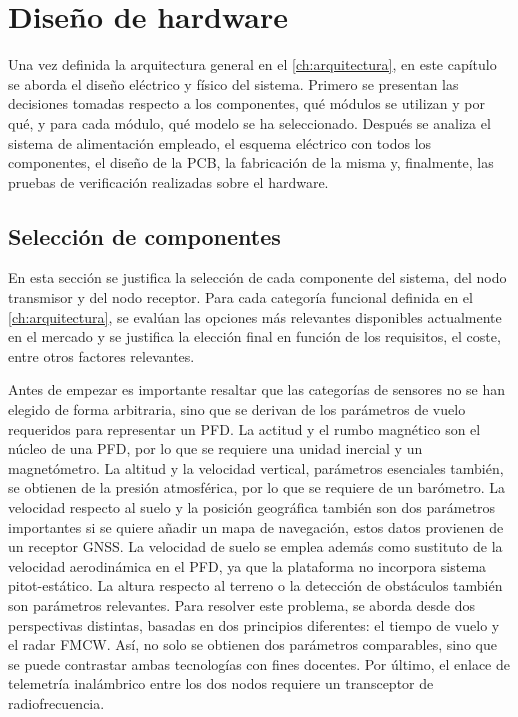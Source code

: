 
\chapter{Diseño de hardware}
\label{ch:hardware}

Una vez definida la arquitectura general en el \cref{ch:arquitectura}, en este capítulo se aborda el diseño eléctrico y físico del sistema. Primero se presentan las decisiones tomadas respecto a los componentes, qué módulos se utilizan y por qué, y para cada módulo, qué modelo se ha seleccionado. Después se analiza el sistema de alimentación empleado, el esquema eléctrico con todos los componentes, el diseño de la PCB, la fabricación de la misma y, finalmente, las pruebas de verificación realizadas sobre el hardware. 

\section{Selección de componentes}
\label{sec:seleccion_componentes}

En esta sección se justifica la selección de cada componente del sistema, del nodo transmisor y del nodo receptor. Para cada categoría funcional definida en el \cref{ch:arquitectura}, se evalúan las opciones más relevantes disponibles actualmente en el mercado y se justifica la elección final en función de los requisitos, el coste, entre otros factores relevantes. 

Antes de empezar es importante resaltar que las categorías de sensores no se han elegido de forma arbitraria, sino que se derivan de los parámetros de vuelo requeridos para representar un PFD. La actitud y el rumbo magnético son el núcleo de una PFD, por lo que se requiere una unidad inercial y un magnetómetro. La altitud y la velocidad vertical, parámetros esenciales también, se obtienen de la presión atmosférica, por lo que se requiere de un barómetro. La velocidad respecto al suelo y la posición geográfica también son dos parámetros importantes si se quiere añadir un mapa de navegación, estos datos provienen de un receptor GNSS. La velocidad de suelo se emplea además como sustituto de la velocidad aerodinámica en el PFD, ya que la plataforma no incorpora sistema pitot-estático. La altura respecto al terreno o la detección de obstáculos también son parámetros relevantes. Para resolver este problema, se aborda desde dos perspectivas distintas, basadas en dos principios diferentes: el tiempo de vuelo y el radar FMCW. Así, no solo se obtienen dos parámetros comparables, sino que se puede contrastar ambas tecnologías con fines docentes. Por último, el enlace de telemetría inalámbrico entre los dos nodos requiere un transceptor de radiofrecuencia.



